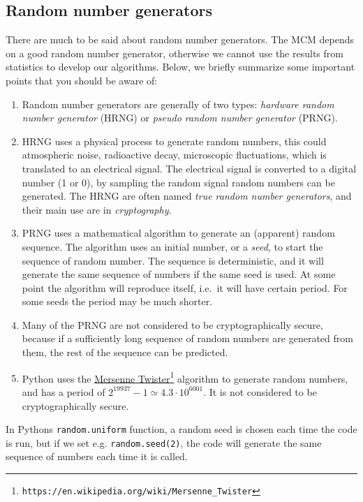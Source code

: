 \documentclass[graybox,sectrefs,envcountresetchap,open=right,final]{svmonodo}
\begin{document}
\subsection{Random number generators}
There are much to be said about random number generators. The MCM depends on a good random number generator, otherwise we cannot use the results from
statistics to develop our algorithms. Below, we briefly summarize some important points that you should be aware of:

\begin{enumerate}
\item Random number generators are generally of two types: \emph{hardware random number generator} (HRNG) or \emph{pseudo random number generator} (PRNG).

\item HRNG uses a physical process to generate random numbers, this could atmospheric noise, radioactive decay, microscopic fluctuations, which is translated to an electrical signal. The electrical signal is converted to a digital number (1 or 0), by sampling the random signal random numbers can be generated. The HRNG are often named \emph{true random number generators}, and their main use are in \emph{cryptography}.

\item PRNG uses a mathematical algorithm to generate an (apparent) random sequence. The algorithm uses an initial number, or a \emph{seed},  to start the sequence of random number. The sequence is deterministic, and it will generate the same sequence of numbers if the same seed is used. At some point the algorithm will reproduce itself, i.e.~it will have certain period. For some seeds the period may be much shorter.

\item Many of the PRNG are not considered to be cryptographically secure, because if a sufficiently long sequence of random numbers are generated from them, the rest of the sequence can be predicted. 

\item Python uses the \href{{https://en.wikipedia.org/wiki/Mersenne_Twister}}{Mersenne Twister}\footnote{\texttt{https://en.wikipedia.org/wiki/Mersenne\_Twister}} algorithm to generate random numbers, and has a period of $2^{19937}−1\simeq4.3\cdot10^{6001}$. It is not considered to be cryptographically secure.
\end{enumerate}

\noindent
In Pythons \texttt{random.uniform} function, a random seed is chosen each time the code is run, but
if we set e.g. \texttt{random.seed(2)}, the code will generate the same sequence of numbers each time it is called. 
\end{document}
